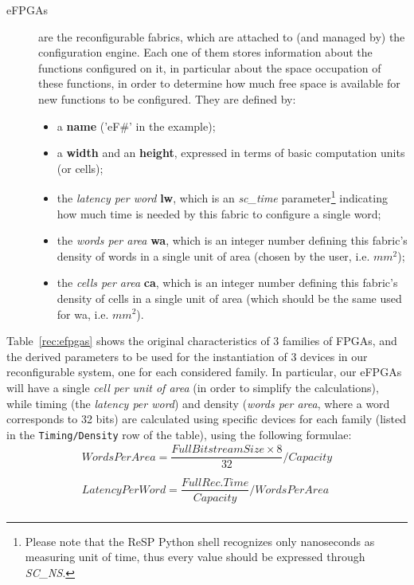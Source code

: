 \begin{description}
  \item[eFPGAs] are the reconfigurable fabrics, which are attached to (and managed by) the configuration engine. Each one of them stores information about the functions configured on it, in particular about the space occupation of these functions, in order to determine how much free space is available for new functions to be configured. They are defined by:
  \begin{itemize}
    \item a \textbf{name} ('eF\#' in the example);
    \item a \textbf{width} and an \textbf{height}, expressed in terms of basic computation units (or cells);
    \item the \textit{latency per word} \textbf{lw}, which is an \mbox{\textit{sc\_time}} parameter\footnote{Please note that the ReSP Python shell recognizes only nanoseconds as measuring unit of time, thus every value should be expressed through \textit{SC\_NS}.} indicating how much time is needed by this fabric to configure a single word;
    \item the \textit{words per area} \textbf{wa}, which is an integer number defining this fabric's density of words in a single unit of area (chosen by the user, i.e. $mm^{2}$);
    \item the \textit{cells per area} \textbf{ca}, which is an integer number defining this fabric's density of cells in a single unit of area (which should be the same used for wa, i.e. $mm^{2}$).
  \end{itemize}
\end{description}

\indent Table~\ref{rec:efpgas} shows the original characteristics of 3 families of FPGAs, and the derived parameters to be used for the instantiation of 3 devices in our reconfigurable system, one for each considered family. In particular, our eFPGAs will have a single \emph{cell per unit of area} (in order to simplify the calculations), while timing (the \emph{latency per word}) and density (\emph{words per area}, where a word corresponds to 32 bits) are calculated using specific devices for each family (listed in the \texttt{Timing\slash Density} row of the table), using the following formulae:
\begin{eqnarray*}
  WordsPerArea = \dfrac{Full Bitstream Size \times 8}{32}/Capacity\\ \\
  LatencyPerWord = \dfrac{Full Rec. Time}{Capacity}/WordsPerArea\\
\end{eqnarray*}

